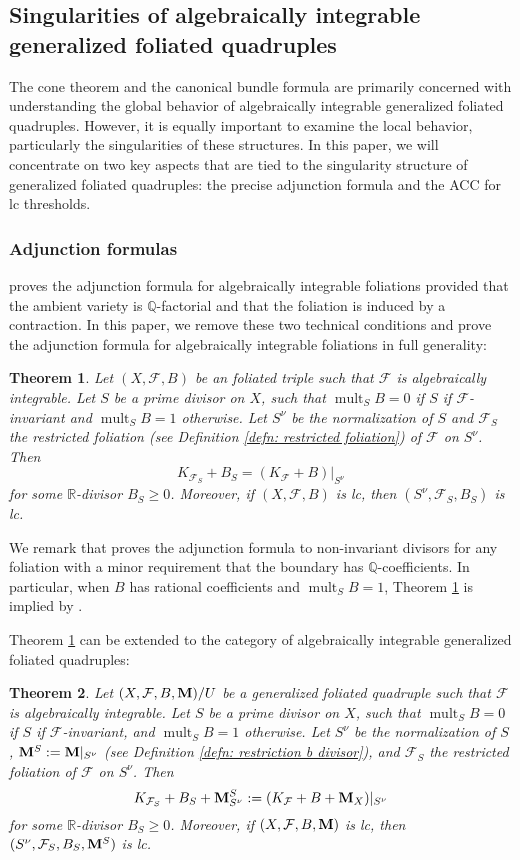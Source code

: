 \documentclass[11pt]{amsart}
\numberwithin{equation}{section}
\newcommand{\Mm}{{\bf{M}}}
\newcommand{\Qq}{\mathbb{Q}}
\newcommand{\Rr}{\mathbb{R}}
\newcommand{\mult}{\operatorname{mult}}
\newcommand{\Ff}{\mathcal{F}}
\newtheorem{thm}{Theorem}[subsection]
\theoremstyle{definition}
\theoremstyle{definition}
\theoremstyle{definition}
\begin{document}
\subsection{Singularities of algebraically integrable generalized foliated quadruples}

The cone theorem and the canonical bundle formula are primarily concerned with understanding the global behavior of algebraically integrable generalized foliated quadruples. However, it is equally important to examine the local behavior, particularly the singularities of these structures. In this paper, we will concentrate on two key aspects that are tied to the singularity structure of generalized foliated quadruples: the precise adjunction formula and the ACC for lc thresholds.

\subsubsection{Adjunction formulas} \cite[Proposition 3.2]{ACSS21} proves the adjunction formula for algebraically integrable foliations provided that the ambient variety is $\Qq$-factorial and that the foliation is induced by a contraction. In this paper, we remove these two technical conditions and prove the adjunction formula for algebraically integrable foliations in full generality:

\begin{thm}\label{thm: fol adj intro}
    Let $(X,\Ff,B)$ be an foliated triple such that $\Ff$ is algebraically integrable. Let $S$ be a prime divisor on $X$, such that $\mult_SB=0$ if $S$ if $\Ff$-invariant and $\mult_SB=1$ otherwise.  Let $S^\nu$ be the normalization of $S$ and $\Ff_S$ the restricted foliation (see Definition \ref{defn: restricted foliation}) of $\Ff$ on $S^\nu$. Then
    $$K_{\Ff_S}+B_S=(K_{\Ff}+B)|_{S^\nu}$$
    for some $\Rr$-divisor $B_S\geq 0$. Moreover, if $(X,\Ff,B)$ is lc, then $(S^\nu,\Ff_S,B_S)$ is lc.
\end{thm}
We remark that \cite[Theorem 3.16]{CS23b} proves the adjunction formula to non-invariant divisors for any foliation with a minor requirement that the boundary has $\Qq$-coefficients. In particular, when $B$ has rational coefficients and $\mult_SB=1$, Theorem \ref{thm: fol adj intro} is implied by \cite[Theorem 3.16]{CS23b}.


Theorem \ref{thm: fol adj intro} can be extended to the category of algebraically integrable generalized foliated quadruples:

\begin{thm}\label{thm: lc adjunction foliation nonnqc}
  Let $(X,\Ff,B,\Mm)/U$ be a generalized foliated quadruple such that $\Ff$ is algebraically integrable. Let $S$ be a prime divisor on $X$, such that $\mult_SB=0$ if $S$ if $\Ff$-invariant, and $\mult_SB=1$ otherwise. Let $S^\nu$ be the normalization of $S$, $\Mm^S:=\Mm|_{S^\nu}$ (see Definition \ref{defn: restriction b divisor}), and $\Ff_S$ the restricted foliation of $\Ff$ on $S^\nu$. Then
  $$K_{\Ff_S}+B_S+\Mm^S_{S^\nu}:=(K_{\Ff}+B+\Mm_X)|_{S^\nu}$$
  for some $\Rr$-divisor $B_S\geq 0$. Moreover, if $(X,\Ff,B,\Mm)$ is lc, then $(S^\nu,\Ff_S,B_S,\Mm^S)$ is lc.
\end{thm}
\end{document}
